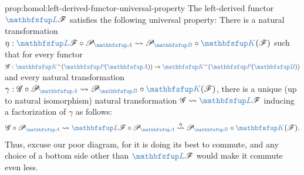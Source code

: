 \begin{prop}{}{prop:homol:left-derived-functor-universal-property}
  The left-derived functor $\categ{L}\mathscr{F}$ satisfies the
  following universal property: There is a natural transformation
  $\eta : \categ{L}\mathscr{F} \circ \mathscr{P}_{\categ{A}}
  \rightsquigarrow \mathscr{P}_{\categ{B}} \circ
  \categ{K}(\mathscr{F})$ such that for every functor
  $\mathscr{G} : \categ{K}^-(\categ{P}(\categ{A})) \to
  \categ{K}^-(\categ{P}(\categ{B}))$ and every natural
  transformation
  $\gamma : \mathscr{G} \circ \mathscr{P}_{\categ{A}}
  \rightsquigarrow \mathscr{P}_{\categ{B}} \circ
  \categ{K}(\mathscr{F})$, there is a unique (up to natural
  isomorphism) natural transformation
  $\mathscr{G} \rightsquigarrow \categ{L}\mathscr{F}$ inducing a
  factorization of $\gamma$ as follows:
  \[
    \mathscr{G} \circ \mathscr{P}_{\categ{A}} \rightsquigarrow
    \categ{L}\mathscr{F} \circ \mathscr{P}_{\categ{A}}
    \overset{\eta}{\rightsquigarrow} \mathscr{P}_{\categ{B}} \circ
    \categ{K}(\mathscr{F}).
  \]
  Thus, excuse our poor diagram, for it is doing its best to commute,
  and any choice of a bottom side other than $\categ{L}\mathscr{F}$
  would make it commute even less.
\end{prop}
